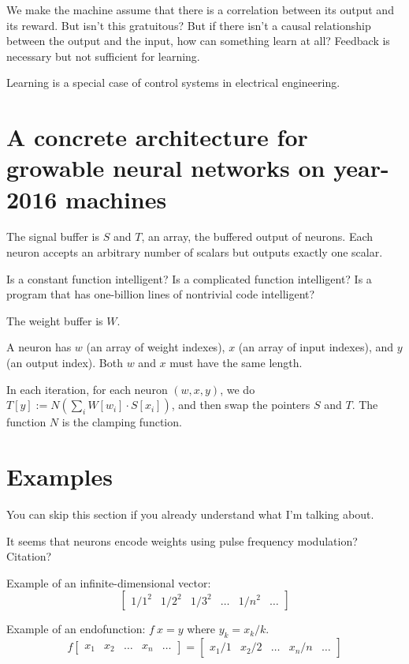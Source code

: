 We make the machine assume that there is a correlation
between its output and its reward.
But isn't this gratuitous?
But if there isn't a causal relationship between the output and the input,
how can something learn at all?
Feedback is necessary but not sufficient for learning.

Learning is a special case of control systems in electrical engineering.

\section{A concrete architecture for growable neural networks on year-2016 machines}

The signal buffer is \(S\) and \(T\), an array, the buffered output of neurons.
Each neuron accepts an arbitrary number of scalars but outputs exactly one scalar.

Is a constant function intelligent? Is a complicated function intelligent?
Is a program that has one-billion lines of nontrivial code intelligent?

The weight buffer is \(W\).

A neuron has \(w\) (an array of weight indexes), \(x\) (an array of input indexes), and \(y\) (an output index).
Both \(w\) and \(x\) must have the same length.

In each iteration, for each neuron \((w,x,y)\),
we do \(T[y] := N \left( \sum_i W[w_i] \cdot S[x_i] \right) \),
and then swap the pointers \(S\) and \(T\).
The function \(N\) is the clamping function.

\section{Examples}

You can skip this section if you already understand what I'm talking about.

It seems that neurons encode weights using pulse frequency modulation? Citation?

Example of an infinite-dimensional vector:
\[
\begin{bmatrix}
1/1^2 & 1/2^2 & 1/3^2 & \ldots & 1/n^2 & \ldots
\end{bmatrix}
\]

Example of an endofunction:
\( f~x = y \) where \( y_k = x_k / k \).
\[
    f
    \begin{bmatrix}
        x_1 & x_2 & \ldots & x_n & \ldots
    \end{bmatrix}
    =
    \begin{bmatrix}
        x_1 / 1 & x_2 / 2 & \ldots & x_n / n & \ldots
    \end{bmatrix}
\]

